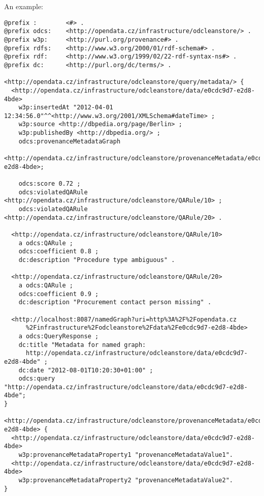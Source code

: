 \pagebreak

An example:

\begin{lstlisting}[caption={Example of query response in TriG}]
@prefix :        <#> .
@prefix odcs:    <http://opendata.cz/infrastructure/odcleanstore/> .
@prefix w3p:     <http://purl.org/provenance#> .
@prefix rdfs:    <http://www.w3.org/2000/01/rdf-schema#> .
@prefix rdf:     <http://www.w3.org/1999/02/22-rdf-syntax-ns#> .
@prefix dc:      <http://purl.org/dc/terms/> .

<http://opendata.cz/infrastructure/odcleanstore/query/metadata/> {
  <http://opendata.cz/infrastructure/odcleanstore/data/e0cdc9d7-e2d8-4bde>
    w3p:insertedAt "2012-04-01 12:34:56.0"^^<http://www.w3.org/2001/XMLSchema#dateTime> ;
    w3p:source <http://dbpedia.org/page/Berlin> ;
    w3p:publishedBy <http://dbpedia.org/> ;
    odcs:provenanceMetadataGraph
      <http://opendata.cz/infrastructure/odcleanstore/provenanceMetadata/e0cdc9d7-e2d8-4bde>;
        
    odcs:score 0.72 ;
    odcs:violatedQARule <http://opendata.cz/infrastructure/odcleanstore/QARule/10> ;
    odcs:violatedQARule <http://opendata.cz/infrastructure/odcleanstore/QARule/20> .  

  <http://opendata.cz/infrastructure/odcleanstore/QARule/10>
    a odcs:QARule ;
    odcs:coefficient 0.8 ;
    dc:description "Procedure type ambiguous" .
        
  <http://opendata.cz/infrastructure/odcleanstore/QARule/20>
    a odcs:QARule ;
    odcs:coefficient 0.9 ;
    dc:description "Procurement contact person missing" .
        
  <http://localhost:8087/namedGraph?uri=http%3A%2F%2Fopendata.cz
      %2Finfrastructure%2Fodcleanstore%2Fdata%2Fe0cdc9d7-e2d8-4bde>
    a odcs:QueryResponse ;
    dc:title "Metadata for named graph:
      http://opendata.cz/infrastructure/odcleanstore/data/e0cdc9d7-e2d8-4bde" ;
    dc:date "2012-08-01T10:20:30+01:00" ;
    odcs:query "http://opendata.cz/infrastructure/odcleanstore/data/e0cdc9d7-e2d8-4bde";
}
    
<http://opendata.cz/infrastructure/odcleanstore/provenanceMetadata/e0cdc9d7-e2d8-4bde> {
  <http://opendata.cz/infrastructure/odcleanstore/data/e0cdc9d7-e2d8-4bde>
    w3p:provenanceMetadataProperty1 "provenanceMetadataValue1".
  <http://opendata.cz/infrastructure/odcleanstore/data/e0cdc9d7-e2d8-4bde>
    w3p:provenanceMetadataProperty2 "provenanceMetadataValue2".
}
\end{lstlisting}


